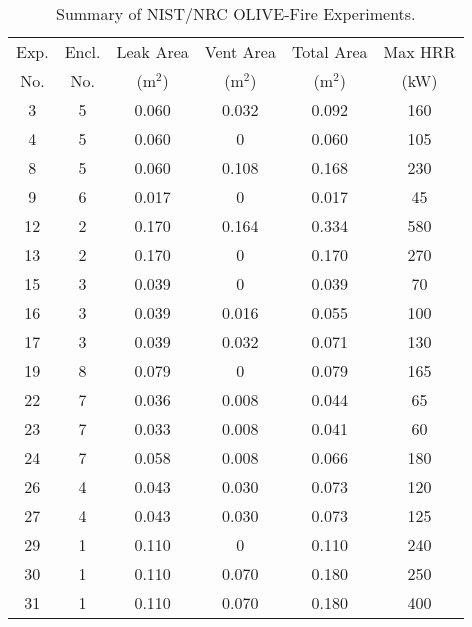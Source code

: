 \begin{table}[!h]
\begin{center}
\caption[Summary of NIST/NRC OLIVE-Fire Experiments]{Summary of NIST/NRC OLIVE-Fire Experiments.}
\label{OLIVE_matrix}
\begin{tabular}{|c|c|c|c|c|c|}
\hline
Exp.   & Encl.      & Leak Area     & Vent Area           & Total Area     & Max HRR          \\
No.    & No.        & (m$^2$)       & (m$^2$)             & (m$^2$)        & (kW)             \\ \hline
3      &  5         & 0.060         & 0.032               & 0.092          & 160              \\ \hline
4      &  5         & 0.060         & 0                   & 0.060          & 105              \\ \hline
8      &  5         & 0.060         & 0.108               & 0.168          & 230              \\ \hline
9      &  6         & 0.017         & 0                   & 0.017          & 45               \\ \hline
12     &  2         & 0.170         & 0.164               & 0.334          & 580              \\ \hline
13     &  2         & 0.170         & 0                   & 0.170          & 270              \\ \hline
15     &  3         & 0.039         & 0                   & 0.039          & 70               \\ \hline
16     &  3         & 0.039         & 0.016               & 0.055          & 100              \\ \hline
17     &  3         & 0.039         & 0.032               & 0.071          & 130              \\ \hline
19     &  8         & 0.079         & 0                   & 0.079          & 165              \\ \hline
22     &  7         & 0.036         & 0.008               & 0.044          & 65               \\ \hline
23     &  7         & 0.033         & 0.008               & 0.041          & 60               \\ \hline
24     &  7         & 0.058         & 0.008               & 0.066          & 180              \\ \hline
26     &  4         & 0.043         & 0.030               & 0.073          & 120              \\ \hline
27     &  4         & 0.043         & 0.030               & 0.073          & 125              \\ \hline
29     &  1         & 0.110         & 0                   & 0.110          & 240              \\ \hline
30     &  1         & 0.110         & 0.070               & 0.180          & 250              \\ \hline
31     &  1         & 0.110         & 0.070               & 0.180          & 400              \\ \hline
\end{tabular}
\end{center}
\end{table}


